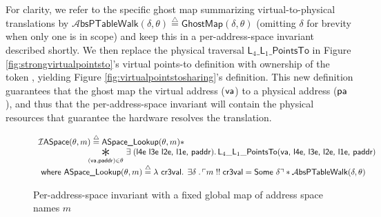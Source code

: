 For clarity, we refer to the specific ghost map summarizing virtual-to-physical translations by 
\mbox{$\mathcal{A}\textsf{bsPTableWalk}(\delta,\theta) \stackrel{\triangle}{=} \mathsf{GhostMap}(\delta,\theta)$}
(omitting $\delta$ for brevity when only one is in scope)
and keep this in a per-address-space invariant described shortly.
We then replace the physical traversal $\textsf{L}_{4}\_\textsf{L}_{1}\_\textsf{PointsTo}$ in Figure \ref{fig:strongvirtualpointsto}'s virtual points-to definition
with ownership of the token \ghostmaptoken{\delta}{\vaddr}{\paddr}, %
yielding Figure \ref{fig:virtualpointstosharing}'s definition.
This new definition guarantees that the ghost map \add{$\theta$}  the virtual address ($\mathsf{va}$) to a physical address ($\textsf{pa}$),
and thus that the per-address-space invariant  will contain the physical resources that guarantee  the hardware resolves the translation.

  \begin{figure*}
  \footnotesize
\vspace{-1em}
\centerline{$
\begin{array}{l}
  \mathcal{I}\textsf{ASpace}(\ptablestore,m)\stackrel{\triangle}{=} \textsf{ASpace\_Lookup}(\ptablestore,m) \ast \\
 \qquad\qquad\qquad \bigast{(\vaddr, \textsf{paddr})\in \ptablestore}{\exists\;(\textsf{l4e l3e l2e, l1e, paddr})\ldotp \textsf{L}_{4}\_\textsf{L}_{1}\_\textsf{PointsTo}(\vaddr\textsf{, l4e, l3e, l2e, l1e, paddr})} \\
  \textsf{ where } 
   \textsf{ASpace\_Lookup} (\ptablestore,m) \stackrel{\triangle}{=} \lambda\textsf{ cr3val} \ldotp \; \exists \gammaPred \; \ldotp \ulcorner m \; !!\; \textsf{cr3val} = \textsf{Some } \gammaPred \urcorner \ast
    \ptableabswalk{\delta,\theta}
\end{array}
$}
\vspace{-1em}
\caption{Per-address-space invariant with a fixed global map of address space names $m$}
  \label{fig:peraspaceinvariant}
\vspace{-1em}
  \end{figure*}

